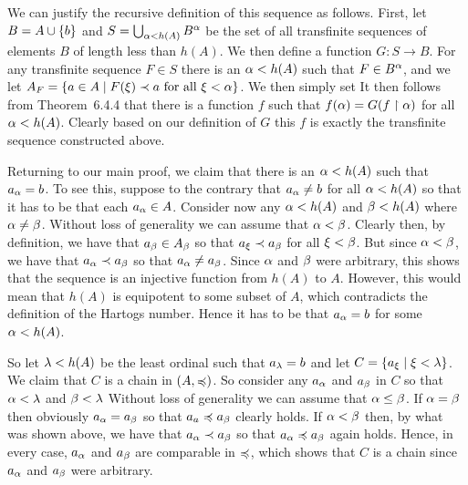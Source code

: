 \begin{questions}
{{      We can justify the recursive definition of this sequence as follows.
      First, let $B = A \cup \left\{ b \right\}$ and $S = \bigcup_{\alpha < h(A)} B^\alpha$ be the set of all transfinite sequences of elements $B$ of length less than $h(A)$.
      We then define a function $G: S \to B$.
      For any transfinite sequence $F \in S$ there is an $\alpha < h(A)$ such that $F \in B^\alpha$, and we let $A_F = \left\{ a \in A \mid F(\xi) \prec a \text{ for all } \xi < \alpha \right\}$.
      We then simply set
      It then follows from Theorem~6.4.4 that there is a function $f$ such that $f(\alpha) = G(f \restriction \alpha)$ for all $\alpha < h(A)$.
      Clearly based on our definition of $G$ this $f$ is exactly the transfinite sequence constructed above.

      Returning to our main proof, we claim that there is an $\alpha < h(A)$ such that $a_\alpha = b$.
      To see this, suppose to the contrary that $a_\alpha \neq b$ for all $\alpha < h(A)$ so that it has to be that each $a_\alpha \in A$.
      Consider now any $\alpha < h(A)$ and $\beta < h(A)$ where $\alpha \neq \beta$.
      Without loss of generality we can assume that $\alpha < \beta$.
      Clearly then, by definition, we have that $a_\beta \in A_\beta$ so that $a_\xi \prec a_\beta$ for all $\xi < \beta$.
      But since $\alpha < \beta$, we have that $a_\alpha \prec a_\beta$ so that $a_\alpha \neq a_\beta$.
      Since $\alpha$ and $\beta$ were arbitrary, this shows that the sequence is an injective function from $h(A)$ to $A$.
      However, this would mean that $h(A)$ is equipotent to some subset of $A$, which contradicts the definition of the Hartogs number.
      Hence it has to be that $a_\alpha = b$ for some $\alpha < h(A)$.

      So let $\lambda < h(A)$ be the least ordinal such that $a_\lambda = b$ and let $C = \left\{ a_\xi \mid \xi < \lambda \right\}$.
      We claim that $C$ is a chain in $(A, \preccurlyeq)$.
      So consider any $a_\alpha$ and $a_\beta$ in $C$ so that $\alpha < \lambda$ and $\beta < \lambda$
      Without loss of generality we can assume that $\alpha \leq \beta$.
      If $\alpha = \beta$ then obviously $a_\alpha = a_\beta$ so that $a_a \preccurlyeq a_\beta$ clearly holds.
      If $\alpha < \beta$ then, by what was shown above, we have that $a_\alpha \prec a_\beta$ so that $a_\alpha \preccurlyeq a_\beta$ again holds.
      Hence, in every case, $a_\alpha$ and $a_\beta$ are comparable in $\preccurlyeq$, which shows that $C$ is a chain since $a_\alpha$ and $a_\beta$ were arbitrary.

}}
\end{questions}
